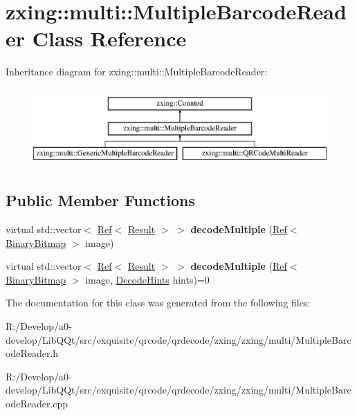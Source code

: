\hypertarget{classzxing_1_1multi_1_1_multiple_barcode_reader}{}\section{zxing\+:\+:multi\+:\+:Multiple\+Barcode\+Reader Class Reference}
\label{classzxing_1_1multi_1_1_multiple_barcode_reader}
Inheritance diagram for zxing\+:\+:multi\+:\+:Multiple\+Barcode\+Reader\+:\begin{figure}[H]
\begin{center}
\leavevmode
\includegraphics[height=3.000000cm]{classzxing_1_1multi_1_1_multiple_barcode_reader}
\end{center}
\end{figure}
\subsection*{Public Member Functions}
\begin{DoxyCompactItemize}
\item 
\mbox{\label{classzxing_1_1multi_1_1_multiple_barcode_reader_a54cdafda0e955b3ead1db6d9d292b77a}} 
virtual std\+::vector$<$ \mbox{\hyperlink{classzxing_1_1_ref}{Ref}}$<$ \mbox{\hyperlink{classzxing_1_1_result}{Result}} $>$ $>$ {\bfseries decode\+Multiple} (\mbox{\hyperlink{classzxing_1_1_ref}{Ref}}$<$ \mbox{\hyperlink{classzxing_1_1_binary_bitmap}{Binary\+Bitmap}} $>$ image)
\item 
\mbox{\label{classzxing_1_1multi_1_1_multiple_barcode_reader_ac25a212135ce0c4458d5649851631b5f}} 
virtual std\+::vector$<$ \mbox{\hyperlink{classzxing_1_1_ref}{Ref}}$<$ \mbox{\hyperlink{classzxing_1_1_result}{Result}} $>$ $>$ {\bfseries decode\+Multiple} (\mbox{\hyperlink{classzxing_1_1_ref}{Ref}}$<$ \mbox{\hyperlink{classzxing_1_1_binary_bitmap}{Binary\+Bitmap}} $>$ image, \mbox{\hyperlink{classzxing_1_1_decode_hints}{Decode\+Hints}} hints)=0
\end{DoxyCompactItemize}


The documentation for this class was generated from the following files\+:\begin{DoxyCompactItemize}
\item 
R\+:/\+Develop/a0-\/develop/\+Lib\+Q\+Qt/src/exquisite/qrcode/qrdecode/zxing/zxing/multi/Multiple\+Barcode\+Reader.\+h\item 
R\+:/\+Develop/a0-\/develop/\+Lib\+Q\+Qt/src/exquisite/qrcode/qrdecode/zxing/zxing/multi/Multiple\+Barcode\+Reader.\+cpp\end{DoxyCompactItemize}
